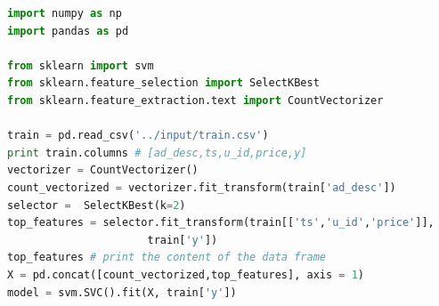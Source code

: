 \begin{lstlisting}[language=Python, caption=Example script,captionpos=b,label = {listing-experiment-graph}]
import numpy as np
import pandas as pd

from sklearn import svm
from sklearn.feature_selection import SelectKBest
from sklearn.feature_extraction.text import CountVectorizer

train = pd.read_csv('../input/train.csv') 
print train.columns # [ad_desc,ts,u_id,price,y]
vectorizer = CountVectorizer()
count_vectorized = vectorizer.fit_transform(train['ad_desc'])
selector =  SelectKBest(k=2)
top_features = selector.fit_transform(train[['ts','u_id','price']], 
				      train['y'])
top_features # print the content of the data frame			     
X = pd.concat([count_vectorized,top_features], axis = 1)
model = svm.SVC().fit(X, train['y'])
\end{lstlisting}

